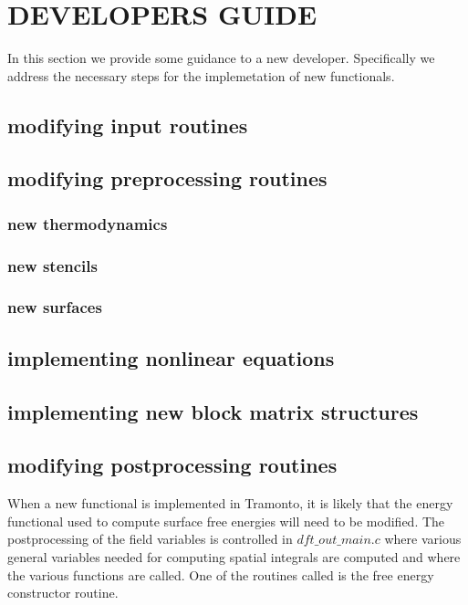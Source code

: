 \documentclass[10pt,onecolumn]{article}
\begin{document}
\section{DEVELOPERS GUIDE}

In this section we provide some guidance to a new developer.  Specifically we address the necessary steps for the implemetation of new functionals.

\subsection{modifying input routines}

\subsection{modifying preprocessing routines}

\subsubsection{new thermodynamics}
\subsubsection{new stencils}
\subsubsection{new surfaces}

\subsection{implementing nonlinear equations}

\subsection{implementing new block matrix structures}


\subsection{modifying postprocessing routines}
When a new functional is implemented in Tramonto, it is likely that the energy 
functional used to compute surface free energies will need to be modified.  The postprocessing of the field variables is controlled in $dft\_out\_main.c$ where various general variables needed for computing spatial integrals are computed and where the various functions are called.  One of the routines called is the free energy constructor routine.
\end{document}
